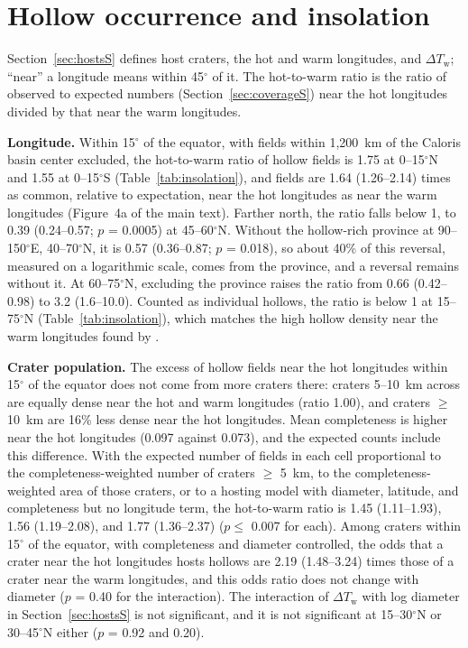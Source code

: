 \documentclass{planetary}
\begin{document}
\clearpage

\section{Hollow occurrence and insolation}
\label{sec:insolationS}

Section~\ref{sec:hostsS} defines host craters, the hot and warm longitudes, and $\Delta T_\mathrm{w}$; ``near'' a longitude means within 45$^\circ$ of it. The hot-to-warm ratio is the ratio of observed to expected numbers (Section~\ref{sec:coverageS}) near the hot longitudes divided by that near the warm longitudes.

\textbf{Longitude.} Within 15$^\circ$ of the equator, with fields within 1,200~km of the Caloris basin center excluded, the hot-to-warm ratio of hollow fields is 1.75 at 0--15$^\circ$N and 1.55 at 0--15$^\circ$S (Table~\ref{tab:insolation}), and fields are 1.64 (1.26--2.14) times as common, relative to expectation, near the hot longitudes as near the warm longitudes (Figure~4a of the main text). Farther north, the ratio falls below 1, to 0.39 (0.24--0.57; $p$ = 0.0005) at 45--60$^\circ$N. Without the hollow-rich province at 90--150$^\circ$E, 40--70$^\circ$N, it is 0.57 (0.36--0.87; $p$ = 0.018), so about 40\% of this reversal, measured on a logarithmic scale, comes from the province, and a reversal remains without it. At 60--75$^\circ$N, excluding the province raises the ratio from 0.66 (0.42--0.98) to 3.2 (1.6--10.0). Counted as individual hollows, the ratio is below 1 at 15--75$^\circ$N (Table~\ref{tab:insolation}), which matches the high hollow density near the warm longitudes found by \textcite{bickel2025}.

\textbf{Crater population.} The excess of hollow fields near the hot longitudes within 15$^\circ$ of the equator does not come from more craters there: craters 5--10~km across are equally dense near the hot and warm longitudes (ratio 1.00), and craters $\geq$ 10~km are 16\% less dense near the hot longitudes. Mean completeness is higher near the hot longitudes (0.097 against 0.073), and the expected counts include this difference. With the expected number of fields in each cell proportional to the completeness-weighted number of craters $\geq$ 5~km, to the completeness-weighted area of those craters, or to a hosting model with diameter, latitude, and completeness but no longitude term, the hot-to-warm ratio is 1.45 (1.11--1.93), 1.56 (1.19--2.08), and 1.77 (1.36--2.37) ($p \leq$ 0.007 for each). Among craters within 15$^\circ$ of the equator, with completeness and diameter controlled, the odds that a crater near the hot longitudes hosts hollows are 2.19 (1.48--3.24) times those of a crater near the warm longitudes, and this odds ratio does not change with diameter ($p$ = 0.40 for the interaction). The interaction of $\Delta T_\mathrm{w}$ with log diameter in Section~\ref{sec:hostsS} is not significant, and it is not significant at 15--30$^\circ$N or 30--45$^\circ$N either ($p$ = 0.92 and 0.20).
\end{document}
